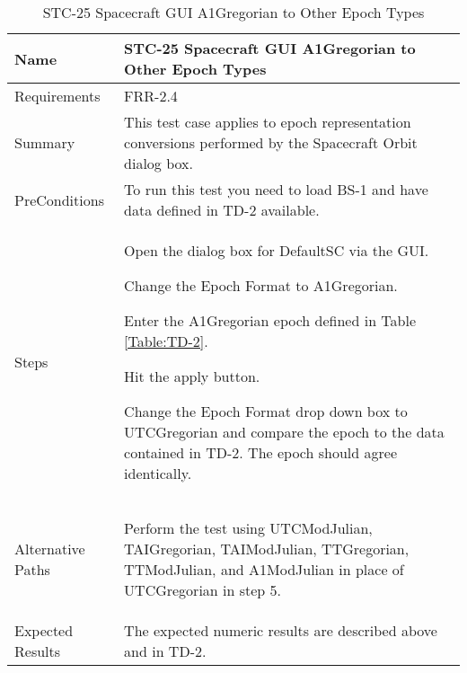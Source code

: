 \begin{table}[htbp!]
\centering
      \begin{tabular}{|p{1.05 in} |p{4.75 in} |}
      \hline
         \rowcolor[rgb]{0.8,0.8,0.8} Name & STC-25 Spacecraft GUI A1Gregorian to Other Epoch Types\\
         \hline
         Requirements & FRR-2.4\\ \hline
         Summary &
         This test case applies to epoch representation conversions performed by the Spacecraft Orbit dialog box.  \\
         \hline
         PreConditions & To run this test you need to load BS-1 and have data defined in TD-2 available.\\
         \hline
         Steps &
         \begin{compactenum}
         \item Open the dialog box for DefaultSC via the GUI.
         \item Change the Epoch Format to A1Gregorian.
         \item Enter the A1Gregorian epoch defined in Table \ref{Table:TD-2}.
         \item Hit the apply button.
         \item Change the Epoch Format drop down box to UTCGregorian and compare the epoch to the
          data contained in TD-2. The epoch should agree identically.
         \end{compactenum}\\
		 \hline
         Alternative Paths &
         \begin{compactenum}
         \item Perform the test using UTCModJulian, TAIGregorian, TAIModJulian, TTGregorian, TTModJulian,
         and A1ModJulian in place of UTCGregorian in step 5.
         \end{compactenum}\\
         \hline
         Expected Results & The expected numeric results are described above and in TD-2.\\
      \hline
\end{tabular}
      \label{Table:STC-25}
      \caption{STC-25 Spacecraft GUI A1Gregorian to Other Epoch Types}
\end{table} 